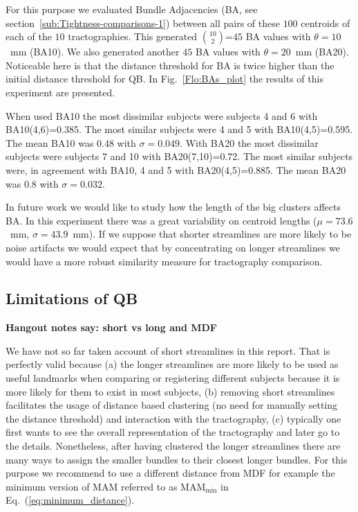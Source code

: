 \documentclass{bioinfo}
\begin{document}
For this purpose we evaluated Bundle Adjacencies
(BA, see section~\ref{sub:Tightness-comparisons-1}) between all pairs of these
$100$ centroids of each of the $10$ tractographies. This generated
${10}\choose{2}$=$45$ BA values with $\theta=10$~mm (BA10). We also
generated another $45$ BA values with $\theta=20$~mm (BA20). Noticeable
here is that the distance threshold for BA is twice higher than the
initial distance threshold for QB. In Fig.~\ref{Flo:BAs_plot} the
results of this experiment are presented.

When used BA10 the most dissimilar subjects were subjects 4 and 6 with
BA10(4,6)=0.385. The most similar subjects were 4 and 5 with
BA10(4,5)=0.595. The mean BA10 was 0.48 with $\sigma=0.049$. With BA20
the most dissimilar subjects were subjects 7 and 10 with
BA20(7,10)=0.72. The most similar subjects were, in agreement with BA10,
4 and 5 with BA20(4,5)=0.885. The mean BA20 was 0.8 with $\sigma=0.032$.

In future work we would like to study how the length of the big clusters
affects BA. In this experiment there was a great variability on centroid
lengths ($\mu=73.6$~mm, $\sigma=43.9$~mm). If we suppose that shorter
streamlines are more likely to be noise artifacts we would expect that
by concentrating on longer streamlines we would have a more robust
similarity measure for tractography comparison.


\subsection{Limitations of QB\label{sub:short_tracks}}

\textbf{Hangout notes say: short vs long and MDF}

We have not so far taken account of short streamlines in this
report. That is perfectly valid because (a) the longer streamlines are
more likely to be used as useful landmarks when comparing or registering
different subjects because it is more likely for them to exist in most
subjects, (b) removing short streamlines facilitates the usage of
distance based clustering (no need for manually setting the distance
threshold) and interaction with the tractography, (c) typically one
first wants to see the overall representation of the tractography and
later go to the details. Nonetheless, after having clustered the longer
streamlines there are many ways to assign the smaller bundles to their
closest longer bundles. For this purpose we recommend to use a different
distance from MDF for example the minimum version of MAM referred to as
$\textrm{MAM}_{\textrm{min}}$ in Eq.~(\ref{eq:minimum_distance}).
\end{document}
